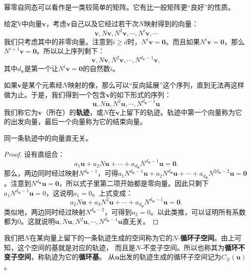 \documentclass[12pt,UTF8]{ctexbook}
\begin{document}
幂零自同态可以看作是一类较简单的矩阵。它有比一般矩阵更“良好”的性质。

给定$\mathbb{V}$中向量$\mathbf{v}$，考虑$\mathbf{v}$自己以及它经过若干次$N$映射得到的向量：
$$ \mathbf{v}, N\mathbf{v}, N^2 \mathbf{v}, \cdots , N^i \mathbf{v} ,\cdots $$
我们只考虑其中的非零向量。注意到$i \geqslant d$时，$N^i \mathbf{v} = \mathbf{0}$。而且如果$N^i \mathbf{v} = \mathbf{0}$，那么$N^{i+1} \mathbf{v} = \mathbf{0}$。所以以上序列剩下：
$$ \mathbf{v}, N\mathbf{v}, N^2 \mathbf{v}, \cdots , N^{d_\mathbf{v} - 1} \mathbf{v}, $$
其中$d_\mathbf{v}$是第一个让$N^i \mathbf{v} = \mathbf{0}$的自然数$i$。

如果$\mathbf{v}$是某个元素经$N$映射的像，那么可以“反向延展”这个序列，直到无法再这样做为止。于是，我们得到一个包含$\mathbf{v}$的如下形式的序列：
$$ \mathbf{u}, N\mathbf{u}, N^2 \mathbf{u}, \cdots , N^{d_\mathbf{u} - 1} \mathbf{u} $$
我们称它为$\mathbf{v}$（所在）的\textbf{轨迹}，或$N$在$\mathbf{v}$上留下的轨迹。轨迹中第一个向量称为它的出发向量，最后一个向量称为它的结束向量。
\begin{pp}\label{pp:6_12_3}
    同一条轨迹中的向量直无关。
\end{pp}
\begin{proof} %
设有直组合：
$$ a_1 \mathbf{u} + a_2 N\mathbf{u} +\cdots + a_{d_\mathbf{u}} N^{d_\mathbf{u} - 1} \mathbf{u} = \mathbf{0}.$$
那么，两边同时经过映射$N^{d_\mathbf{u} - 1}$，可得$a_1 N^{d_\mathbf{u} - 1}\mathbf{u} + a_2 N^{d_\mathbf{u}}\mathbf{u} +\cdots + a_{d_\mathbf{u}} N^{2d_\mathbf{u} - 2} \mathbf{u} = \mathbf{0}$。注意到$N^{d_\mathbf{u}}\mathbf{u}= \mathbf{0}$，所以式子里第二项开始都是零向量。因此只剩下$a_1 N^{d_\mathbf{u} - 1}\mathbf{u} = 0$，这说明$a_1 = 0$。上式变成：
$$ a_2 N\mathbf{u} + a_3 N^2\mathbf{u} +\cdots + a_{d_\mathbf{u}} N^{d_\mathbf{u} - 1} \mathbf{u} = \mathbf{0}. $$
类似地，两边同时经过映射$N^{d_\mathbf{u} - 2}$，可得到$a_2 = 0$。以此类推，可以证明所有系数都为0。这就说明$\mathbf{u}, N\mathbf{u}, N^2 \mathbf{u}, \cdots , N^{d_\mathbf{u} - 1} \mathbf{u}$直无关。

\end{proof}

我们把$N$在某向量上留下的一条轨迹生成的空间称为它的$N$-\textbf{循环子空间}。由上可知，这个空间的基就是对应的轨迹，
而且是$N$-不变子空间。所以也称其为\textbf{循环不变子空间}，称轨迹为它的\textbf{循环基}。
从$\mathbf{u}$出发的轨迹生成的循环子空间记为$C_N(\mathbf{u})$。
\end{document}
